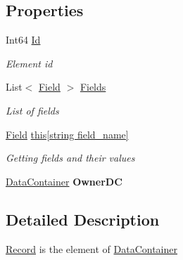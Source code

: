 \subsection*{Properties}
\begin{DoxyCompactItemize}
\item 
Int64 \hyperlink{class_dwarf_d_b_1_1_data_structures_1_1_record_a6b9df97308b20ff8504cd88c56aded41}{Id}
\begin{DoxyCompactList}\small\item\em Element id \end{DoxyCompactList}\item 
List$<$ \hyperlink{class_dwarf_d_b_1_1_data_structures_1_1_field}{Field} $>$ \hyperlink{class_dwarf_d_b_1_1_data_structures_1_1_record_ae901326df950b811aa2cbb5f632a21c3}{Fields}
\begin{DoxyCompactList}\small\item\em List of fields \end{DoxyCompactList}\item 
\hyperlink{class_dwarf_d_b_1_1_data_structures_1_1_field}{Field} \hyperlink{class_dwarf_d_b_1_1_data_structures_1_1_record_a303a0895fdeb635fa47469b2ac46c4a3}{this\mbox{[}string field\+\_\+name\mbox{]}}
\begin{DoxyCompactList}\small\item\em Getting fields and their values \end{DoxyCompactList}\item 
\hypertarget{class_dwarf_d_b_1_1_data_structures_1_1_record_adc6c66e17187956974f6102e89054528}{\hyperlink{class_dwarf_d_b_1_1_data_structures_1_1_data_container}{Data\+Container} {\bfseries Owner\+D\+C}}\label{class_dwarf_d_b_1_1_data_structures_1_1_record_adc6c66e17187956974f6102e89054528}

\end{DoxyCompactItemize}


\subsection{Detailed Description}
\hyperlink{class_dwarf_d_b_1_1_data_structures_1_1_record}{Record} is the element of \hyperlink{class_dwarf_d_b_1_1_data_structures_1_1_data_container}{Data\+Container} 



